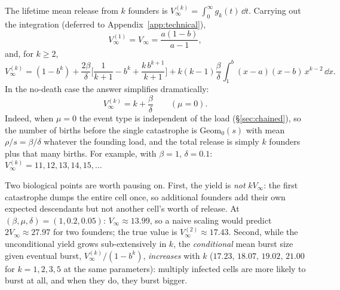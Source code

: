 The lifetime mean release from $k$ founders is
$V_\infty^{(k)}=\int_0^\infty g_k(t)\,\dd t$. Carrying out the integration
(deferred to Appendix~\ref{app:technical}),
\begin{equation}
V_\infty^{(1)}=V_\infty=\frac{a(1-b)}{a-1},
\end{equation}
and, for $k\ge2$,
\begin{equation}
V_\infty^{(k)}
=(1-b^k)
+\frac{2\beta}{\delta}\Biggl[\frac{1}{k+1}-b^k+\frac{k\,b^{k+1}}{k+1}\Biggr]
+k(k-1)\frac{\beta}{\delta}\int_1^b (x-a)(x-b)\,x^{k-2}\,\dd x.
\label{eq:Vk}
\end{equation}
In the no-death case the answer simplifies dramatically:
\begin{equation}
V_\infty^{(k)}=k+\frac{\beta}{\delta}\qquad(\mu=0).
\label{eq:Vkmu0}
\end{equation}
Indeed, when $\mu=0$ the event type is independent of the load
(\S\ref{sec:chained}), so the number of births before the single catastrophe
is $\mathrm{Geom}_0(s)$ with mean $\rho/s=\beta/\delta$ whatever the
founding load, and the total release is simply $k$ founders plus that many
births. For example, with $\beta=1$, $\delta=0.1$:
$V_\infty^{(k)}=11,12,13,14,15,\ldots$

Two biological points are worth pausing on. First, the yield is \emph{not}
$kV_\infty$: the first catastrophe dumps the entire cell once, so additional
founders add their own expected descendants but not another cell's worth of
release. At $(\beta,\mu,\delta)=(1,0.2,0.05)$: $V_\infty\approx13.99$, so a
naive scaling would predict $2V_\infty\approx27.97$ for two founders; the
true value is $V_\infty^{(2)}\approx17.43$. Second, while the
unconditional yield grows sub-extensively in $k$, the \emph{conditional}
mean burst size given eventual burst, $V_\infty^{(k)}/(1-b^k)$,
\emph{increases} with $k$ ($17.23,\,18.07,\,19.02,\,21.00$ for
$k=1,2,3,5$ at the same parameters): multiply infected cells are more likely
to burst at all, and when they do, they burst bigger.

